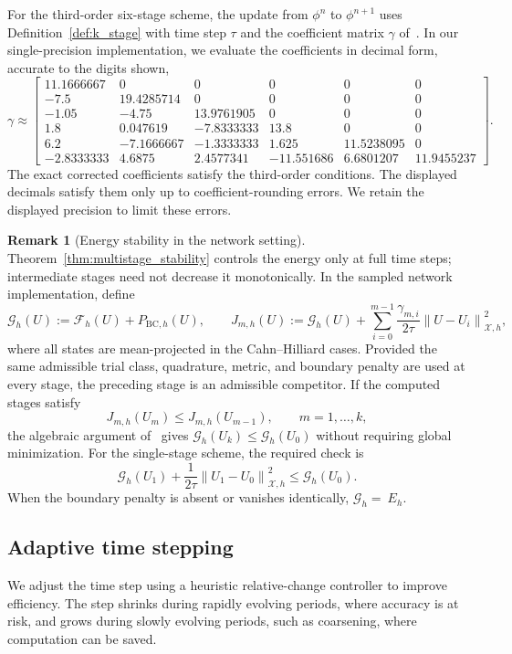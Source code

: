 \documentclass[11pt,letterpaper]{article}
\theoremstyle{plain}
\theoremstyle{definition}
\newtheorem{remark}{Remark}[section]
\newcommand{\norm}[1]{\left\| #1 \right\|}
\newcommand{\E}{\mathcal{F}}
\newcommand{\X}{\mathcal{X}}
\begin{document}
For the third-order six-stage scheme, the update from $\phi^n$ to $\phi^{n+1}$ uses Definition~\ref{def:k_stage} with time step $\tau$ and the coefficient matrix $\gamma$ of~\cite{Zaitzeff2020}. In our single-precision implementation, we evaluate the coefficients in decimal form, accurate to the digits shown,
\begin{equation}
\label{eq:gamma_decimal}
\gamma
\approx
\begin{bmatrix}
11.1666667 & 0 & 0 & 0 & 0 & 0 \\
-7.5 & 19.4285714 & 0 & 0 & 0 & 0 \\
-1.05 & -4.75 & 13.9761905 & 0 & 0 & 0 \\
1.8 & 0.047619 & -7.8333333 & 13.8 & 0 & 0 \\
6.2 & -7.1666667 & -1.3333333 & 1.625 & 11.5238095 & 0 \\
-2.8333333 & 4.6875 & 2.4577341 & -11.551686 & 6.6801207 & 11.9455237
\end{bmatrix}.
\end{equation}
The exact corrected coefficients satisfy the third-order conditions. The displayed decimals satisfy them only up to coefficient-rounding errors. We retain the displayed precision to limit these errors.

\begin{remark}[Energy stability in the network setting]
\label{rem:stability-network}
Theorem~\ref{thm:multistage_stability} controls the energy only at full time steps; intermediate stages need not decrease it monotonically. In the sampled network implementation, define
\[
\mathcal G_h(U):=\E_h(U)+P_{\mathrm{BC},h}(U),\qquad
J_{m,h}(U):=\mathcal G_h(U)+\sum_{i=0}^{m-1}\frac{\gamma_{m,i}}{2\tau}\norm{U-U_i}_{\X,h}^2,
\]
where all states are mean-projected in the Cahn--Hilliard cases. Provided the same admissible trial class, quadrature, metric, and boundary penalty are used at every stage, the preceding stage is an admissible competitor. If the computed stages satisfy
\[
J_{m,h}(U_m)\le J_{m,h}(U_{m-1}),\qquad m=1,\ldots,k,
\]
the algebraic argument of~\cite[Theorem~2.1]{Zaitzeff2020} gives $\mathcal G_h(U_k)\le\mathcal G_h(U_0)$ without requiring global minimization. For the single-stage scheme, the required check is
\[
\mathcal G_h(U_1)+\frac{1}{2\tau}\norm{U_1-U_0}_{\X,h}^2\le\mathcal G_h(U_0).
\]
When the boundary penalty is absent or vanishes identically, $\mathcal G_h = \ E_h$. 
\end{remark}

\subsection{Adaptive time stepping}
\label{subsec:time-adaptive}
We adjust the time step using a heuristic relative-change controller to improve efficiency. The step shrinks during rapidly evolving periods, where accuracy is at risk, and grows during slowly evolving periods, such as coarsening, where computation can be saved.
\end{document}
